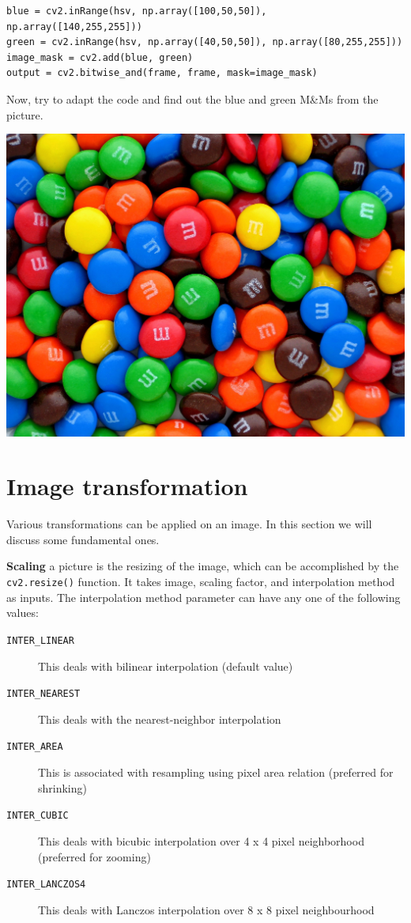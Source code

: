\documentclass{labo}
\begin{document}
\begin{verbatim}
blue = cv2.inRange(hsv, np.array([100,50,50]), np.array([140,255,255]))
green = cv2.inRange(hsv, np.array([40,50,50]), np.array([80,255,255]))
image_mask = cv2.add(blue, green)
output = cv2.bitwise_and(frame, frame, mask=image_mask)
\end{verbatim}

\begin{leftbar}
Now, try to adapt the code and find out the {\color{blue}blue} and {\color{green}green} M\&Ms from the picture.
\end{leftbar}

\begin{center}
	\includegraphics[width=.5\textwidth]{Plain-M&Ms-Pile.jpg}
\end{center}

\section*{Image transformation}
Various transformations can be applied on an image. In this section we will discuss some fundamental ones.

\textbf{Scaling} a picture is the resizing of the image, which can be accomplished by the \texttt{cv2.resize()} function. It takes image, scaling factor, and interpolation method as inputs.
The interpolation method parameter can have any one of the following values:
\begin{description}
	\item[\texttt{INTER\_LINEAR}] This deals with bilinear interpolation (default value)
	\item[\texttt{INTER\_NEAREST}] This deals with the nearest-neighbor interpolation
	\item[\texttt{INTER\_AREA}] This is associated with resampling using pixel area relation (preferred for shrinking)
	\item[\texttt{INTER\_CUBIC}] This deals with bicubic interpolation over 4 x 4 pixel neighborhood (preferred for zooming)
	\item[\texttt{INTER\_LANCZOS4}] This deals with Lanczos interpolation over 8 x 8 pixel neighbourhood
\end{description}
\end{document}
